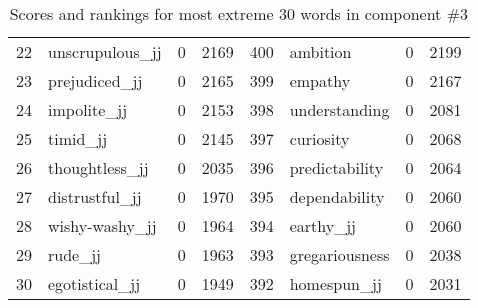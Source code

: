 \begin{table}[tbp]
\begin{tabular}{| rlr@{.}l | rlr@{.}l |}
    22 & unscrupulous\_jj & 0 & 2169    &    400 & ambition & 0 & 2199 \\
    23 & prejudiced\_jj & 0 & 2165    &    399 & empathy & 0 & 2167 \\
    24 & impolite\_jj & 0 & 2153    &    398 & understanding & 0 & 2081 \\
    25 & timid\_jj & 0 & 2145    &    397 & curiosity & 0 & 2068 \\
    26 & thoughtless\_jj & 0 & 2035    &    396 & predictability & 0 & 2064 \\
    27 & distrustful\_jj & 0 & 1970    &    395 & dependability & 0 & 2060 \\
    28 & wishy-washy\_jj & 0 & 1964    &    394 & earthy\_jj & 0 & 2060 \\
    29 & rude\_jj & 0 & 1963    &    393 & gregariousness & 0 & 2038 \\
    30 & egotistical\_jj & 0 & 1949    &    392 & homespun\_jj & 0 & 2031 \\
    \hline
    \end{tabular}
    \caption{Scores and rankings for most extreme 30 words in component \#3} 
\end{table}
\clearpage
